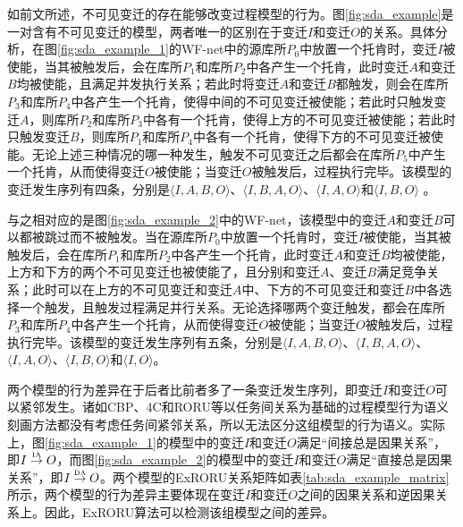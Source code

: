 如前文所述，不可见变迁的存在能够改变过程模型的行为。图\ref{fig:sda_example}是一对含有不可见变迁的模型，两者唯一的区别在于变迁$I$和变迁$O$的关系。具体分析，在图\ref{fig:sda_example_1}的WF-net中的源库所$P_{0}$中放置一个托肯时，变迁$I$被使能，当其被触发后，会在库所$P_{1}$和库所$P_{2}$中各产生一个托肯，此时变迁$A$和变迁$B$均被使能，且满足并发执行关系；若此时将变迁$A$和变迁$B$都触发，则会在库所$P_{3}$和库所$P_{4}$中各产生一个托肯，使得中间的不可见变迁被使能；若此时只触发变迁$A$，则库所$P_{2}$和库所$P_{3}$中各有一个托肯，使得上方的不可见变迁被使能；若此时只触发变迁$B$，则库所$P_{1}$和库所$P_{4}$中各有一个托肯，使得下方的不可见变迁被使能。无论上述三种情况的哪一种发生，触发不可见变迁之后都会在库所$P_{5}$中产生一个托肯，从而使得变迁$O$被使能；当变迁$O$被触发后，过程执行完毕。该模型的变迁发生序列有四条，分别是$\langle I,A,B,O\rangle$、$\langle I,B,A,O\rangle$、$\langle I,A,O\rangle$和$\langle I,B,O\rangle$
。

与之相对应的是图\ref{fig:sda_example_2}中的WF-net，该模型中的变迁$A$和变迁$B$可以都被跳过而不被触发。当在源库所$P_{0}$中放置一个托肯时，变迁$I$被使能，当其被触发后，会在库所$P_{1}$和库所$P_{2}$中各产生一个托肯，此时变迁$A$和变迁$B$均被使能，上方和下方的两个不可见变迁也被使能了，且分别和变迁$A$、变迁$B$满足竞争关系；此时可以在上方的不可见变迁和变迁$A$中、下方的不可见变迁和变迁$B$中各选择一个触发，且触发过程满足并行关系。无论选择哪两个变迁触发，都会在库所$P_{3}$和库所$P_{4}$中各产生一个托肯，从而使得变迁$O$被使能；当变迁$O$被触发后，过程执行完毕。该模型的变迁发生序列有五条，分别是$\langle I,A,B,O\rangle$、$\langle I,B,A,O\rangle$、$\langle I,A,O\rangle$、$\langle I,B,O\rangle$和$\langle I,O\rangle$。

两个模型的行为差异在于后者比前者多了一条变迁发生序列，即变迁$I$和变迁$O$可以紧邻发生。诸如CBP、4C和RORU等以任务间关系为基础的过程模型行为语义刻画方法都没有考虑任务间紧邻关系，所以无法区分这组模型的行为语义。实际上，图\ref{fig:sda_example_1}的模型中的变迁$I$和变迁$O$满足“间接总是因果关系”，即$I\overset{\text{\tiny{IA}}}{\rightarrow}O$，而图\ref{fig:sda_example_2}的模型中的变迁$I$和变迁$O$满足“直接总是因果关系”，即$I\overset{\text{\tiny{DA}}}{\rightarrow}O$。两个模型的ExRORU关系矩阵如表\ref{tab:sda_example_matrix}所示，两个模型的行为差异主要体现在变迁$I$和变迁$O$之间的因果关系和逆因果关系上。因此，ExRORU算法可以检测该组模型之间的差异。

